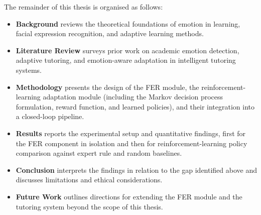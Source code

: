 The remainder of this thesis is organised as follows:

\begin{itemize}
  \item \textbf{Background} reviews the theoretical foundations of emotion in learning, facial expression recognition, and adaptive learning methods.
  \item \textbf{Literature Review} surveys prior work on academic emotion detection, adaptive tutoring, and emotion-aware adaptation in intelligent tutoring systems.
  \item \textbf{Methodology} presents the design of the \ac{FER} module, the reinforcement-learning adaptation module (including the Markov decision process formulation, reward function, and learned policies), and their integration into a closed-loop pipeline.
  \item \textbf{Results} reports the experimental setup and quantitative findings, first for the \ac{FER} component in isolation and then for reinforcement-learning policy comparison against expert rule and random baselines.
  \item \textbf{Conclusion} interprets the findings in relation to the gap identified above and discusses limitations and ethical considerations.
  \item \textbf{Future Work} outlines directions for extending the \ac{FER} module and the tutoring system beyond the scope of this thesis.
\end{itemize}
